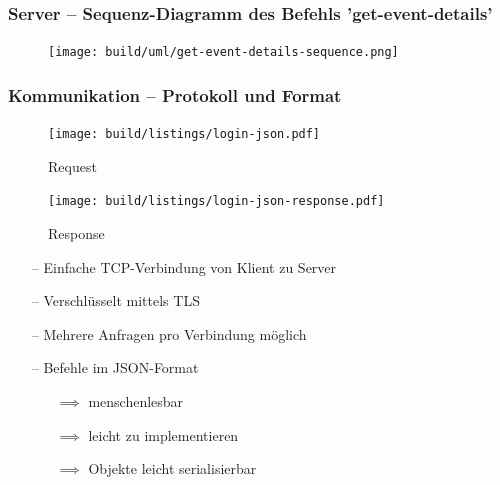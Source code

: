 \documentclass[aspectratio=1610]{beamer}
\begin{document}
	\begin{frame}[plain]
        \frametitle{\textbf{Server} -- Sequenz-Diagramm des Befehls 'get-event-details'}
        \begin{figure}[!htb]
            \centering
            \texttt{[image: build/uml/get-event-details-sequence.png]}
        \end{figure}
    \end{frame}



    \begin{frame}[plain]
        \frametitle{\textbf{Kommunikation} -- Protokoll und Format}
        \begin{minipage}{0.5\textwidth}
            \begin{figure}
                \texttt{[image: build/listings/login-json.pdf]}
                \caption{Request}
            \end{figure}
            \begin{figure}
                \texttt{[image: build/listings/login-json-response.pdf]}
                \caption{Response}
            \end{figure}
        \end{minipage}%
        \begin{minipage}{0.5\textwidth}
            \begin{itemize}
                \item[--] Einfache TCP-Verbindung von Klient zu Server
                \item[--] Verschlüsselt mittels TLS
                \item[--] Mehrere Anfragen pro Verbindung möglich
                \item[--] Befehle im JSON-Format
                    \begin{itemize}
                        \item[$\implies$] menschenlesbar
                        \item[$\implies$] leicht zu implementieren
                        \item[$\implies$] Objekte leicht serialisierbar
                    \end{itemize}
            \end{itemize}
        \end{minipage}
	\end{frame}
\end{document}
